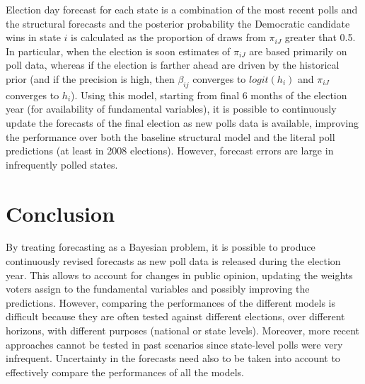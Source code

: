 \documentclass[
  12pt]{article}
\begin{document}
Election day forecast for each state is a combination of the most recent
polls and the structural forecasts and the posterior probability the
Democratic candidate wins in state \(i\) is calculated as the proportion
of draws from \(\pi_{iJ}\) greater that 0.5. In particular, when the
election is soon estimates of \(\pi_{iJ}\) are based primarily on poll
data, whereas if the election is farther ahead are driven by the
historical prior (and if the precision is high, then \(\beta_{ij}\)
converges to \(logit(h_i)\) and \(\pi_{iJ}\) converges to \(h_i\)).
Using this model, starting from final 6 months of the election year (for
availability of fundamental variables), it is possible to continuously
update the forecasts of the final election as new polls data is
available, improving the performance over both the baseline structural
model and the literal poll predictions (at least in 2008 elections).
However, forecast errors are large in infrequently polled states.

\hypertarget{sec-conc}{%
\section{Conclusion}\label{sec-conc}}

By treating forecasting as a Bayesian problem, it is possible to produce
continuously revised forecasts as new poll data is released during the
election year. This allows to account for changes in public opinion,
updating the weights voters assign to the fundamental variables and
possibly improving the predictions. However, comparing the performances
of the different models is difficult because they are often tested
against different elections, over different horizons, with different
purposes (national or state levels). Moreover, more recent approaches
cannot be tested in past scenarios since state-level polls were very
infrequent. Uncertainty in the forecasts need also to be taken into
account to effectively compare the performances of all the models.
\end{document}
